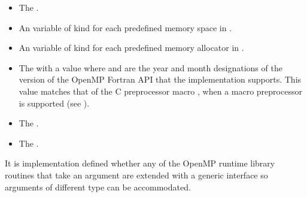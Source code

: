 \begin{fortranspecific}
\begin{itemize}
\item The   .

\item An   variable of kind  for each predefined memory space in .

\item An   variable of kind  for each predefined memory allocator in .

\item The    with a value  where 
and  are the year and month designations of the version of the OpenMP Fortran
API that the implementation supports. This value matches that of the C preprocessor
macro , when a macro preprocessor is supported (see
).

\item The   .

\item The   .

\end{itemize}


It is implementation defined whether any of the OpenMP runtime library routines that
take an argument are extended with a generic interface so arguments of different 
type can be accommodated. 
\end{fortranspecific}







